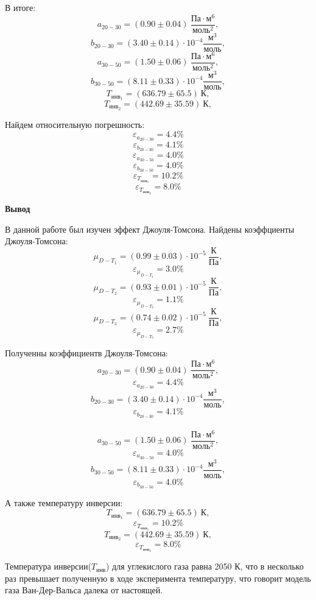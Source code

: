 В итоге:
\[a_{20-30}  = (0.90\pm 0.04)\ \frac{Па\cdot м^6}{моль^2},\]
\[b_{20-30}  = (3.40\pm 0.14)\cdot 10^{-4} \frac{м^3}{моль},\]
\[a_{30-50} = (1.50\pm 0.06)\ \frac{Па\cdot м^6}{моль^2},\]
\[b_{30-50}  = (8.11\pm 0.33)\cdot 10^{-4} \frac{м^3}{моль},\]
\[T_{инв_1} = (636.79\pm 65.5)\ К,\]
\[T_{инв_2} = (442.69\pm 35.59)\ К,\]

Найдем относительную погрешность:
\[\varepsilon_{a_{20-30}} = 4.4\%\]
\[\varepsilon_{b_{20-30}} = 4.1\%\]
\[\varepsilon_{a_{30-50}} = 4.0\%\]
\[\varepsilon_{b_{30-50}} = 4.0\%\]
\[\varepsilon_{T_{инв_1}} = 10.2\%\]
\[\varepsilon_{T_{инв_2}} = 8.0\%\]

\begin{center}
	\large{\textbf{Вывод}}
\end{center}

В данной работе был изучен эффект Джоуля-Томсона. Найдены коэффциенты Джоуля-Томсона:
\[\mu_{D-T_1} = (0.99 \pm 0.03)\cdot 10^{-5}\ \frac{К}{Па},\]
\[\varepsilon_{\mu_{D-T_1}} = 3.0\%\]
\[\mu_{D-T_2} = (0.93 \pm 0.01)\cdot 10^{-5}\ \frac{К}{Па},\]
\[\varepsilon_{\mu_{D-T_2}} = 1.1\%\]
\[\mu_{D-T_3} = (0.74 \pm 0.02)\cdot 10^{-5}\ \frac{К}{Па},\]
\[\varepsilon_{\mu_{D-T_3}} = 2.7\%\]

Полученны коэффициентв Джоуля-Томсона:
\[a_{20-30}  = (0.90\pm 0.04)\ \frac{Па\cdot м^6}{моль^2},\]
\[\varepsilon_{a_{20-30}} = 4.4\%\]
\[b_{20-30}  = (3.40\pm 0.14)\cdot 10^{-4} \frac{м^3}{моль},\]
\[\varepsilon_{b_{20-30}} = 4.1\%\]
\\
\[a_{30-50} = (1.50\pm 0.06)\ \frac{Па\cdot м^6}{моль^2},\]
\[\varepsilon_{a_{30-50}} = 4.0\%\]
\[b_{30-50}  = (8.11\pm 0.33)\cdot 10^{-4} \frac{м^3}{моль},\]
\[\varepsilon_{b_{30-50}} = 4.0\%\]

А также температуру инверсии:
\[T_{инв_1} = (636.79\pm 65.5)\ К,\]
\[\varepsilon_{T_{инв_1}} = 10.2\%\]
\[T_{инв_2} = (442.69\pm 35.59)\ К,\]
\[\varepsilon_{T_{инв_2}} = 8.0\%\]

Температура инверсии($T_{инв}$) для углекислого газа равна 2050 К, что в несколько раз превышает полученную в ходе эксперимента температуру, что говорит модель газа Ван-Дер-Вальса далека от настоящей.

\newpage
{}







 













 




